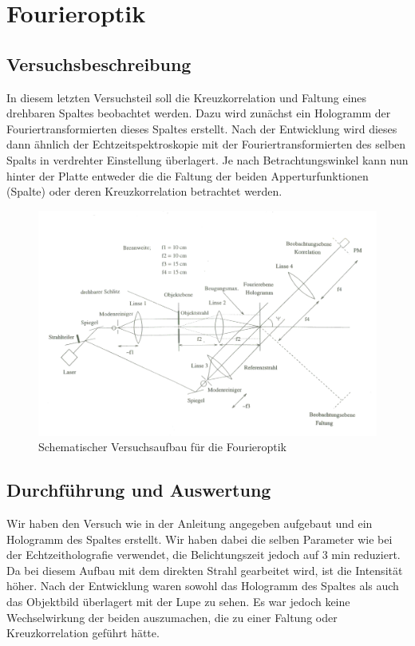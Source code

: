 \section{Fourieroptik}
\subsection{Versuchsbeschreibung}

In diesem letzten Versuchsteil soll die Kreuzkorrelation und Faltung eines drehbaren Spaltes beobachtet werden. Dazu wird zunächst ein Hologramm der Fouriertransformierten dieses Spaltes erstellt. Nach der Entwicklung wird dieses dann ähnlich der Echtzeitspektroskopie mit der Fouriertransformierten des selben Spalts in verdrehter Einstellung überlagert. Je nach Betrachtungswinkel kann nun hinter der Platte entweder die die Faltung der beiden Apperturfunktionen (Spalte) oder deren Kreuzkorrelation betrachtet werden.

\begin{figure}[H]
 \includegraphics[width=\textwidth]{BilderAufbau/A-Bamberger-aufbau.png}
 \caption{Schematischer Versuchsaufbau für die Fourieroptik \cite{fourier}}
 \label{fourier_aufbau}
\end{figure}


\subsection{Durchführung und Auswertung}

Wir haben den Versuch wie in der Anleitung \cite{fourier} angegeben aufgebaut und ein Hologramm des Spaltes erstellt. Wir haben dabei die selben Parameter wie bei der Echtzeitholografie verwendet, die Belichtungszeit jedoch auf 3 min reduziert. Da bei diesem Aufbau mit dem direkten Strahl gearbeitet wird, ist die Intensität höher. Nach der Entwicklung waren sowohl das Hologramm des Spaltes als auch das Objektbild überlagert mit der Lupe zu sehen. Es war jedoch keine Wechselwirkung der beiden auszumachen, die zu einer Faltung oder Kreuzkorrelation geführt hätte.

